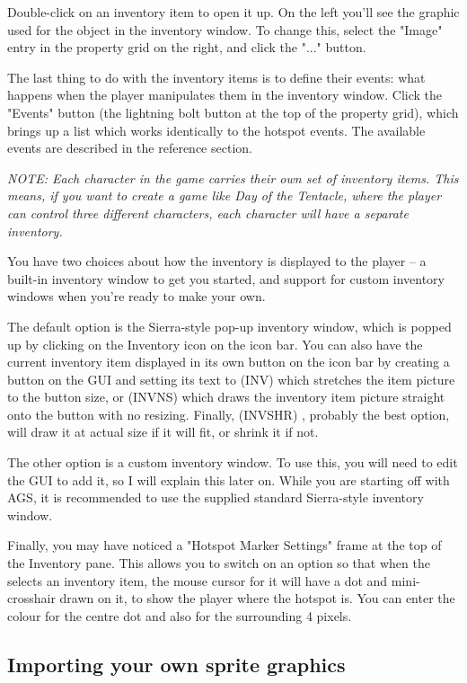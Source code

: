 Double-click on an inventory item to open it up. On the
left you'll see the graphic used for the object in the inventory window. To change
this, select the "Image" entry in the property grid on the right, and click the "..."
button.

The last thing to do with the inventory items is to define their events:
what happens when the player manipulates them in the inventory window. Click
the "Events" button (the lightning bolt button at the top of the property grid),
which brings up a list which works identically to the hotspot events.
The available events are described in the reference section.

\it{NOTE: Each character in the game carries their own set of inventory items.
This means, if you want to create a game like Day of the Tentacle, where the
player can control three different characters, each character will have a
separate inventory.}

You have two choices about how the inventory is displayed to the player -- a
built-in inventory window to get you started, and support for custom inventory
windows when you're ready to make your own.

The default option is the Sierra-style pop-up inventory window, which is
popped up by clicking on the Inventory icon on the icon bar. You can also have
the current inventory item displayed in its own button on the icon bar by creating
a button on the GUI and setting its text to  (INV)  which stretches the item
picture to the button size, or  (INVNS)  which draws the inventory item
picture straight onto the button with no resizing. Finally, (INVSHR) , probably
the best option, will draw it at actual size if it will fit, or shrink it if not.

The other option is a custom inventory window. To use this, you
will need to edit the GUI to add it, so I will explain this later on.
While you are starting off with AGS, it is recommended to use the supplied
standard Sierra-style inventory window.

Finally, you may have noticed a "Hotspot Marker Settings" frame at the top of the
Inventory pane. This allows you to switch on an option so that when the
selects an inventory item, the mouse cursor for it will have a dot and mini-crosshair
drawn on it, to show the player where the hotspot is.
You can enter the colour for the centre dot and also for the surrounding 4 pixels.

\subsection{Importing your own sprite graphics}%

